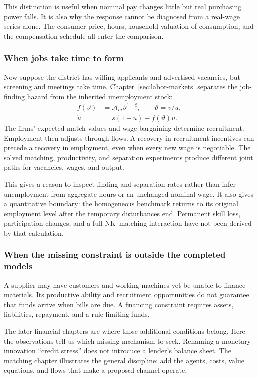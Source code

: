 This distinction is useful when nominal pay changes little but real purchasing
power falls. It is also why the response cannot be diagnosed from a real-wage
series alone. The consumer price, hours, household valuation of consumption,
and the compensation schedule all enter the comparison.

\subsubsection{When jobs take time to form}

Now suppose the district has willing applicants and advertised vacancies,
but screening and meetings take time. Chapter~\ref{sec:labor-markets} separates
the job-finding hazard from the inherited unemployment stock:
\begin{align}
 f(\vartheta)&=\mathcal A_m\vartheta^{1-\xi},\qquad\vartheta=v/u,\\
 \dot u&=s(1-u)-f(\vartheta)u.
\end{align}
The firms' expected match values and wage bargaining determine recruitment.
Employment then adjusts through flows. A recovery in recruitment incentives
can precede a recovery in employment, even when every new wage is negotiable.
The solved matching, productivity, and separation experiments produce
different joint paths for vacancies, wages, and output.

This gives a reason to inspect finding and separation rates rather than
infer unemployment from aggregate hours or an unchanged nominal wage. It
also gives a quantitative boundary: the homogeneous benchmark returns to its
original employment level after the temporary disturbances end. Permanent
skill loss, participation changes, and a full NK--matching interaction have
not been derived by that calculation.

\subsubsection{When the missing constraint is outside the completed models}

A supplier may have customers and working machines yet be unable to finance
materials. Its productive ability and recruitment opportunities do not
guarantee that funds arrive when bills are due. A financing constraint requires
assets, liabilities, repayment, and a rule limiting funds.

The later financial chapters are where those additional conditions belong.
Here the observations tell us which missing mechanism to seek. Renaming a
monetary innovation ``credit stress'' does not introduce a lender's balance
sheet. The matching chapter illustrates the general discipline: add the
agents, costs, value equations, and flows that make a proposed channel operate.

